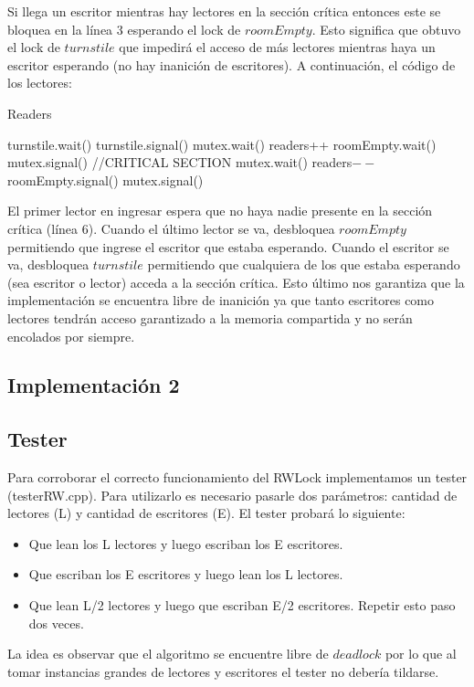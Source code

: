 Si llega un escritor mientras hay lectores en la sección crítica entonces este se bloquea en la línea 3 esperando el lock de $roomEmpty$. Esto significa que obtuvo el lock de $turnstile$ que impedirá el acceso de más lectores mientras haya un escritor esperando (no hay inanición de escritores). A continuación, el código de los lectores:

\begin{algorithm}[H]
\caption{Readers}\label{ej1}
\begin{algorithmic}[1]
	\State turnstile.wait()
	\State turnstile.signal()
	\State mutex.wait()
	\State readers++
		\State roomEmpty.wait()
	\EndIf
	\State mutex.signal()
	\State //CRITICAL SECTION
	\State mutex.wait()
	\State readers$--$
		\State roomEmpty.signal()
	\EndIf
	\State mutex.signal()
\EndProcedure
\end{algorithmic}
\end{algorithm}

El primer lector en ingresar espera que no haya nadie presente en la sección crítica (línea 6). Cuando el último lector se va, desbloquea $roomEmpty$ permitiendo que ingrese el escritor que estaba esperando. Cuando el escritor se va, desbloquea $turnstile$ permitiendo que cualquiera de los que estaba esperando (sea escritor o lector) acceda a la sección crítica. Esto último nos garantiza que la implementación se encuentra libre de inanición ya que tanto escritores como lectores tendrán acceso garantizado a la memoria compartida y no serán encolados por siempre.

\subsection{Implementación 2}



\subsection{Tester}

Para corroborar el correcto funcionamiento del RWLock implementamos un tester (testerRW.cpp). Para utilizarlo es necesario pasarle dos parámetros: cantidad de lectores (L) y cantidad de escritores (E). El tester probará lo siguiente:

\begin{itemize}
	\item Que lean los L lectores y luego escriban los E escritores.
	\item Que escriban los E escritores y luego lean los L lectores.
	\item Que lean L/2 lectores y luego que escriban E/2 escritores. Repetir esto paso dos veces.
\end{itemize}

La idea es observar que el algoritmo se encuentre libre de $deadlock$ por lo que al tomar instancias grandes de lectores y escritores el tester no debería tildarse.





